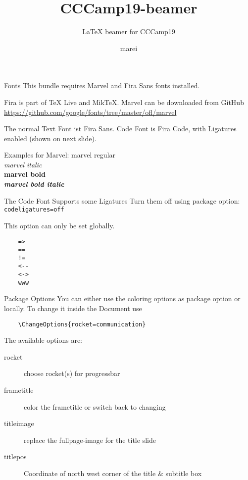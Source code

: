 \documentclass[aspectratio=169,t]{beamer}
\newcommand*{\code}[1]{\texttt{#1}}
\begin{document}
	

\title{CCCamp19-beamer}
\subtitle{\LaTeX{} beamer for CCCamp19}
\author{marei }

\maketitle
	
\begin{frame}{Fonts}
	This bundle requires Marvel and Fira Sans fonts installed.
	
	Fira is part of \TeX{} Live and Mik\TeX{}. Marvel can be downloaded from GitHub \url{https://github.com/google/fonts/tree/master/ofl/marvel}
	
	The normal Text Font ist Fira Sans. Code Font is Fira Code, with Ligatures enabled (shown on next slide).
		
	Examples for Marvel:
	\headerfont marvel regular\\
	\textit{marvel italic}\\
	\bfseries marvel bold\\
	\itshape marvel bold italic
\end{frame}

	
\begin{frame}[fragile]{The Code Font Supports some Ligatures}
	Turn them off using package option: \code{codeligatures=off}
	
	This option can only be set globally.
	\begin{verbatim} 
	=>
	==
	!=	 
	<--
	<->
	www	
	\end{verbatim}
\end{frame}

\begin{frame}[fragile]{Package Options}
	You can either use the coloring options as package option or locally. To change it inside the Document use
	
	\begin{verbatim}
	\ChangeOptions{rocket=communication}
	\end{verbatim}
	The available options are:
	\begin{description}
	\item[rocket] choose rocket(s) for progressbar
	\item[frametitle] color the frametitle or switch back to changing
	\item[titleimage] replace the fullpage-image for the title slide
	\item[titlepos] Coordinate of north west corner of the title \& subtitle box
	\end{description}
\end{frame}
\end{document}
